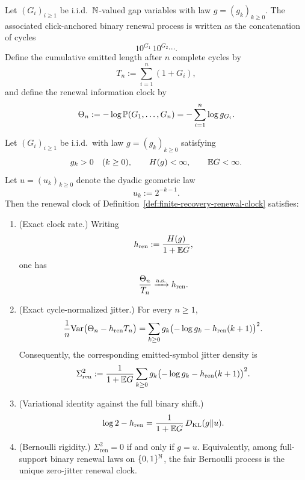 \begin{definition}\label{def:finite-recovery-renewal-clock}
Let $(G_i)_{i\ge 1}$ be i.i.d.\ $\mathbb{N}$-valued gap variables with law $g=(g_k)_{k\ge 0}$. The associated click-anchored binary renewal process is written as the concatenation of cycles
\[
10^{G_1}\,10^{G_2}\cdots.
\]
Define the cumulative emitted length after $n$ complete cycles by
\[
T_n:=\sum_{i=1}^n(1+G_i),
\]
and define the renewal information clock by
\[
\Theta_n
:=
-\log \mathbb{P}(G_1,\dots,G_n)
=
-\sum_{i=1}^n\log g_{G_i}.
\]
\end{definition}

\begin{theorem}\label{thm:finite-recovery-renewal-clock}
Let $(G_i)_{i\ge 1}$ be i.i.d.\ with law $g=(g_k)_{k\ge 0}$ satisfying
\[
g_k>0\quad(k\ge 0),
\qquad
H(g)<\infty,
\qquad
\mathbb{E} G<\infty.
\]
Let $u=(u_k)_{k\ge 0}$ denote the dyadic geometric law
\[
u_k:=2^{-k-1}.
\]
Then the renewal clock of Definition~\ref{def:finite-recovery-renewal-clock} satisfies:
\begin{enumerate}[label=\textup{(\roman*)},leftmargin=*,itemsep=4pt]
\item \textup{(Exact clock rate.)} Writing
\begin{equation}\label{eq:general-renewal-clock-rate}
h_{\mathrm{ren}}
:=
\frac{H(g)}{1+\mathbb{E} G},
\end{equation}
one has
\[
\frac{\Theta_n}{T_n}\xrightarrow{\textup{a.s.}} h_{\mathrm{ren}}.
\]
\item \textup{(Exact cycle-normalized jitter.)} For every $n\ge 1$,
\begin{equation}\label{eq:finite-recovery-renewal-clock-variance}
\frac{1}{n}\mathrm{Var}\bigl(\Theta_n-h_{\mathrm{ren}}T_n\bigr)
=
\sum_{k\ge 0}g_k\bigl(-\log g_k-h_{\mathrm{ren}}(k+1)\bigr)^2.
\end{equation}
Consequently, the corresponding emitted-symbol jitter density is
\begin{equation}\label{eq:finite-recovery-renewal-clock-density}
\Sigma_{\mathrm{ren}}^2
:=
\frac{1}{1+\mathbb{E} G}
\sum_{k\ge 0}g_k\bigl(-\log g_k-h_{\mathrm{ren}}(k+1)\bigr)^2.
\end{equation}
\item \textup{(Variational identity against the full binary shift.)}
\begin{equation}\label{eq:finite-recovery-dyadic-kl}
\log 2-h_{\mathrm{ren}}
=
\frac{1}{1+\mathbb{E} G}\,
D_{\mathrm{KL}}(g\Vert u).
\end{equation}
\item \textup{(Bernoulli rigidity.)} $\Sigma_{\mathrm{ren}}^2=0$ if and only if $g=u$. Equivalently, among full-support binary renewal laws on $\{0,1\}^{\mathbb{N}}$, the fair Bernoulli process is the unique zero-jitter renewal clock.
\end{enumerate}
\end{theorem}

